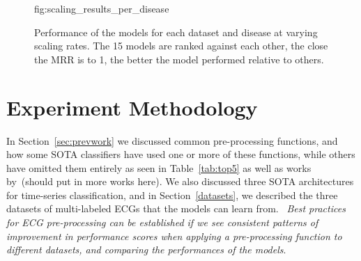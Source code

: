 \documentclass[pmlr,twocolumn]{jmlr}%
\begin{document}
\begin{figure}[t]
\floatconts
  {fig:scaling_results_per_disease}
  {\caption{Performance of the models for each dataset and disease at varying scaling rates. The 15 models are ranked against each other, the close the MRR is to 1, the better the model performed relative to others.}}
  {
  
  
  }
\end{figure}
\section{Experiment Methodology}
\label{sec:experiment}

In Section~\ref{sec:prevwork} we discussed common pre-processing functions, and how some SOTA classifiers have used one or more of these functions, while others have omitted them entirely as seen in Table~\ref{tab:top5} as well as works by~\cite{ribeiro2020automatic}{\color{red}(should put in more works here)}. We also discussed three SOTA architectures for time-series classification, and in Section~\ref{datasets}, we described the three datasets of multi-labeled ECGs that the models can learn from. ~\textit{Best practices for ECG pre-processing can be established if we see consistent patterns of improvement in performance scores when applying a pre-processing function to different datasets, and comparing the performances of the models}. \\
\end{document}
